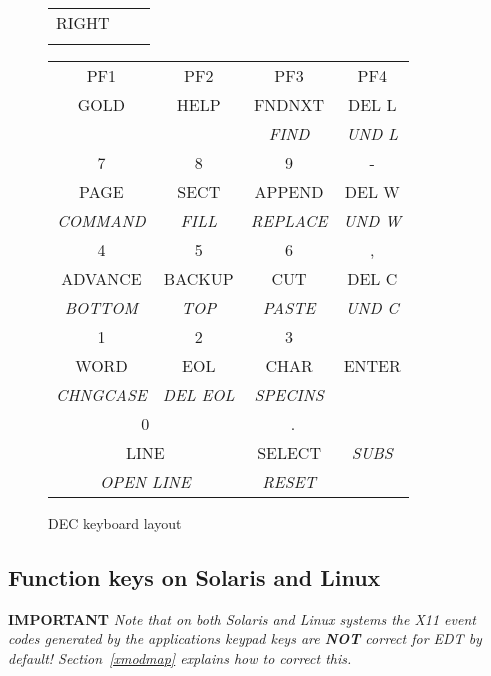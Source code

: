 \documentclass[twoside,11pt]{starlink}
\begin{document}
\begin{figure}[t]
\begin{center}
\begin{tabular}{ccc}
\multicolumn{1}{|c|}{RIGHT} \\
\multicolumn{1}{|c|}{} & \multicolumn{1}{|c|}{} & \multicolumn{1}{|c|}{} \\
\hline
\end{tabular}
\hspace{5mm}
\begin{tabular}{|c|c|c|c|} \hline
PF1      & PF2       & PF3     & PF4   \\
GOLD     & HELP      & FNDNXT  & DEL L \\
         &           & \textit{FIND}    & \textit{UND L} \\ \hline
7        & 8         & 9       & -     \\
PAGE     & SECT      & APPEND  & DEL W \\
\textit{COMMAND}  & \textit{FILL}      & \textit{REPLACE}  & \textit{UND W} \\ \hline
4        & 5         & 6       & ,     \\
ADVANCE  & BACKUP    & CUT     & DEL C \\
\textit{BOTTOM}   & \textit{TOP}       & \textit{PASTE}   & \textit{UND C} \\ \hline
1        & 2         & 3       &       \\
WORD     & EOL       & CHAR    & ENTER \\
\textit{CHNGCASE} & \textit{DEL EOL}   & \textit{SPECINS} &       \\ \cline{1-3}
\multicolumn{2}{|c|}{0}         &~.       &       \\
\multicolumn{2}{|c|}{LINE}      & SELECT  & \textit{SUBS}  \\
\multicolumn{2}{|c|}{\textit{OPEN LINE}} & \textit{RESET}   &       \\ \hline
\end{tabular}
\end{center}
\caption{DEC keyboard layout}
\label{fig:dec-kb}
\normalsize
\end{figure}

\subsection{
Function keys on Solaris and Linux}
\label{function_keys_on_solaris_and_linux}

\textbf{IMPORTANT} \textit{Note that on both Solaris and Linux systems the
X11 event codes generated by the applications keypad keys are \textbf{NOT}
correct for EDT by default! Section~{\ref{xmodmap}} explains how
to correct this. }
\end{document}
